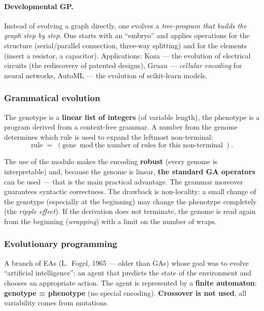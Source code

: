 \documentclass[11pt,a4paper]{article}
\theoremstyle{definition}
\providecommand{\uv}[1]{``#1''}
\begin{document}
\paragraph{Developmental GP.} Instead of evolving a graph directly, one evolves
a \emph{tree-program that builds the graph step by step}. One starts with an
\uv{embryo} and applies operations for the structure (serial/parallel
connection, three-way splitting) and for the elements (insert a resistor, a
capacitor). Applications: Koza --- the evolution of electrical circuits (the
rediscovery of patented designs), Gruau --- \emph{cellular encoding} for neural
networks, AutoML --- the evolution of scikit-learn models.

\subsubsection{Grammatical evolution}

\begin{defbox}
The genotype is a \textbf{linear list of integers} (of variable length), the phenotype is a
program derived from a context-free grammar. A number from the genome determines which rule
is used to expand the leftmost non-terminal:
\[
\text{rule} \;=\; (\text{gene} \bmod \text{the number of rules for this non-terminal}).
\]
\end{defbox}

The use of the modulo makes the encoding \textbf{robust} (every genome is interpretable) and,
because the genome is linear, \textbf{the standard GA operators} can be used --- that is the
main practical advantage. The grammar moreover guarantees syntactic correctness. The drawback
is non-locality: a small change of the genotype (especially at the beginning) may change the
phenotype completely (the \emph{ripple effect}). If the derivation does not terminate, the
genome is read again from the beginning (\emph{wrapping}) with a limit on the number of wraps.

\subsubsection{Evolutionary programming}

\begin{defbox}
A branch of EAs (L.~Fogel, 1965 --- older than GAs) whose goal was to evolve
\uv{artificial intelligence}: an agent that predicts the state of the
environment and chooses an appropriate action. The agent is represented by a
\textbf{finite automaton}; \textbf{genotype = phenotype} (no special encoding).
\textbf{Crossover is not used}, all variability comes from mutations.
\end{defbox}
\end{document}
